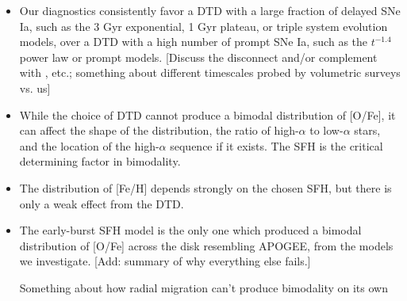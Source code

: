 \documentclass[twocolumn,linenumbers,twocolappendix]{aastex631}
\begin{document}
\begin{itemize}

    \item Our diagnostics consistently favor a DTD with a large fraction of delayed SNe Ia, such as the 3 Gyr exponential, 1 Gyr plateau, or triple system evolution models, over a DTD with a high number of prompt SNe Ia, such as the $t^{-1.4}$ power law or prompt models. [Discuss the disconnect and/or complement with \citet{Maoz2017-CosmicDTD}, etc.; something about different timescales probed by volumetric surveys vs. us]
    
    \item While the choice of DTD cannot produce a bimodal distribution of [O/Fe], it can affect the shape of the distribution, the ratio of high-$\alpha$ to low-$\alpha$ stars, and the location of the high-$\alpha$ sequence if it exists. The SFH is the critical determining factor in bimodality.

    \item The distribution of [Fe/H] depends strongly on the chosen SFH, but there is only a weak effect from the DTD.

    \item The early-burst SFH model is the only one which produced a bimodal distribution of [O/Fe] across the disk resembling APOGEE, from the models we investigate. [Add: summary of why everything else fails.]

    \item [Something about how radial migration can't produce bimodality on its own]
    
\end{itemize}
\end{document}
